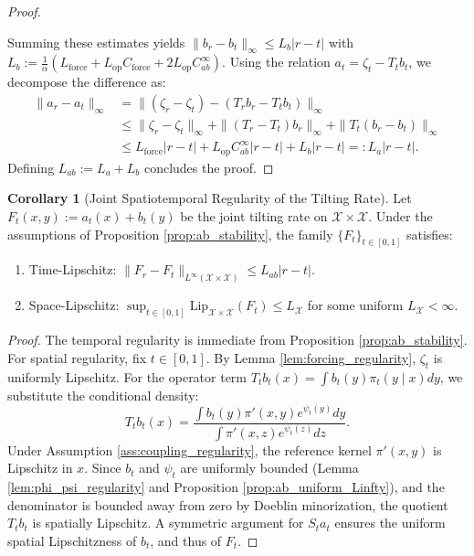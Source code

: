 \documentclass[11pt]{article}
\theoremstyle{definition}
\newtheorem{corollary}[theorem]{Corollary}
\numberwithin{equation}{section}%
\begin{document}
{\begin{proof}
\begin{enumerate}[label=(\roman*)]
\end{enumerate}
Summing these estimates yields $\|b_r - b_t\|_\infty \le L_b |r - t|$ with $L_b := \frac{1}{\alpha}(L_{\mathrm{force}} + L_{\mathrm{op}} C_{\mathrm{force}} + 2 L_{\mathrm{op}} C_{ab}^\infty)$.
Using the relation $a_t = \zeta_t - T_t b_t$, we decompose the difference as:
\begin{align*}
\|a_r - a_t\|_\infty &= \|(\zeta_r - \zeta_t) - (T_r b_r - T_t b_t)\|_\infty \\
&\le \|\zeta_r - \zeta_t\|_\infty + \|(T_r - T_t) b_r\|_\infty + \|T_t(b_r - b_t)\|_\infty \\
&\le L_{\mathrm{force}} |r - t| + L_{\mathrm{op}} C_{ab}^\infty |r - t| + L_b |r - t| =: L_a |r - t|.
\end{align*}
Defining $L_{ab} := L_a + L_b$ concludes the proof.
\end{proof}

\begin{corollary}[Joint Spatiotemporal Regularity of the Tilting Rate]
\label{cor:F_regularity}
Let $F_t(x,y) := a_t(x) + b_t(y)$ be the joint tilting rate on $\mathcal{X} \times \mathcal{X}$. Under the assumptions of Proposition \ref{prop:ab_stability}, the family $\{F_t\}_{t \in [0,1]}$ satisfies:
\begin{enumerate}[label=(\roman*)]
    \item Time-Lipschitz: $\|F_r - F_t\|_{L^\infty(\mathcal{X} \times \mathcal{X})} \le L_{ab} |r - t|$.
    \item Space-Lipschitz: $\sup_{t \in [0,1]} \mathrm{Lip}_{\mathcal{X} \times \mathcal{X}}(F_t) \le L_{\mathcal{X}}$ for some uniform $L_{\mathcal{X}} < \infty$.
\end{enumerate}
\end{corollary}

\begin{proof}
The temporal regularity is immediate from Proposition \ref{prop:ab_stability}. For spatial regularity, fix $t \in [0,1]$. By Lemma \ref{lem:forcing_regularity}, $\zeta_t$ is uniformly Lipschitz. For the operator term $T_t b_t(x) = \int b_t(y) \pi_t(y \mid x) dy$, we substitute the conditional density:
\[
T_t b_t(x) = \frac{\int b_t(y) \pi'(x,y) e^{\psi_t(y)} dy}{\int \pi'(x,z) e^{\psi_t(z)} dz}.
\]
Under Assumption \ref{ass:coupling_regularity}, the reference kernel $\pi'(x,y)$ is Lipschitz in $x$. Since $b_t$ and $\psi_t$ are uniformly bounded (Lemma \ref{lem:phi_psi_regularity} and Proposition \ref{prop:ab_uniform_Linfty}), and the denominator is bounded away from zero by Doeblin minorization, the quotient $T_t b_t$ is spatially Lipschitz. A symmetric argument for $S_t a_t$ ensures the uniform spatial Lipschitzness of $b_t$, and thus of $F_t$.
\end{proof}

}
\end{document}
